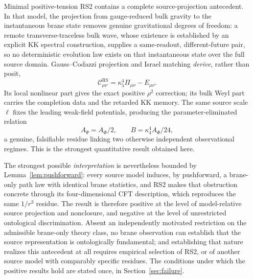 \documentclass[11pt,a4paper]{article}
\theoremstyle{plain}
\theoremstyle{definition}
\newcommand{\kfive}{\kappa_5}
\newcommand{\kfour}{\kappa_4}
\newcommand{\RS}{\mathrm{RS}}
\begin{document}
Minimal positive-tension RS2 contains a complete source-projection
antecedent. In that model, the projection from gauge-reduced bulk gravity
to the instantaneous brane state removes genuine gravitational degrees of
freedom: a remote transverse-traceless bulk wave, whose existence is
established by an explicit KK spectral construction, supplies a
same-readout, different-future pair, so no deterministic evolution law
exists on that instantaneous state over the full source domain.
Gauss--Codazzi projection and Israel matching \emph{derive}, rather than
posit,
\begin{equation}
\mathcal C^{\RS}_{\mu\nu}=\kfive^4\Pi_{\mu\nu}-E_{\mu\nu}.
\end{equation}
Its local nonlinear part gives the exact positive $\rho^2$ correction;
its bulk Weyl part carries the completion data and the retarded KK memory.
The same source scale $\ell$ fixes the leading weak-field potentials,
producing the parameter-eliminated relation
\begin{equation}
A_\Psi=A_\Phi/2,
\qquad
B=\kfour^4A_\Phi/24 ,
\end{equation}
a genuine, falsifiable residue linking two otherwise independent
observational regimes. This is the strongest quantitative result obtained
here.

The strongest possible \emph{interpretation} is nevertheless bounded by
Lemma~\ref{lem:pushforward}: every source model induces, by pushforward, a
brane-only path law with identical brane statistics, and RS2 makes that
obstruction concrete through its four-dimensional CFT description, which
reproduces the same $1/r^3$ residue. The result is therefore positive at
the level of model-relative source projection and nonclosure, and negative
at the level of unrestricted ontological discrimination. Absent an
independently motivated restriction on the admissible brane-only theory
class, no brane observation can establish that the source representation
is ontologically fundamental; and establishing that nature realizes this
antecedent at all requires empirical selection of RS2, or of another source
model with comparably specific residues. The conditions under which the
positive results hold are stated once, in Section~\ref{sec:failure}.
\end{document}
